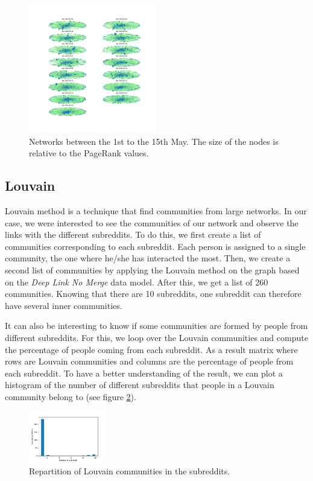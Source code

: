 \begin{figure}[H]
    \centering
    \includegraphics[width=0.5\textwidth]{figures/rank_days.pdf}
    \caption{Networks between the 1st to the 15th May. The size of the nodes is relative to the PageRank values.}
    \label{fig:rankdays}
\end{figure}

\subsection{Louvain}
Louvain method is a technique that find communities from large networks. In our case, we were interested to see the communities of our network and observe the links with the different subreddits. To do this, we first create a list of communities corresponding to each subreddit. Each person is assigned to a single community, the one where he/she has interacted the most. Then, we create a second list of communities by applying the Louvain method on the graph based on the \textit{Deep Link No Merge} data model.
After this, we get a list of 260 communities. Knowing that there are 10 subreddits, one subreddit can therefore have several inner communities. 

It can also be interesting to know if some communities are formed by people from different subreddits. For this, we loop over the Louvain communities and compute the percentage of people coming from each subreddit. As a result matrix where rows are Louvain communities and columns are the percentage of people from each subreddit. To have a better understanding of the result, we can plot a histogram of the number of different subreddits that people in a Louvain community belong to (see figure \ref{fig:louvainrepartition}).

\begin{figure}[H]
    \centering
    \includegraphics[width=0.3\textwidth]{figures/inner_communities_repartition.pdf}
    \caption{ Repartition of Louvain communities in the subreddits.}
    \label{fig:louvainrepartition}
\end{figure}

